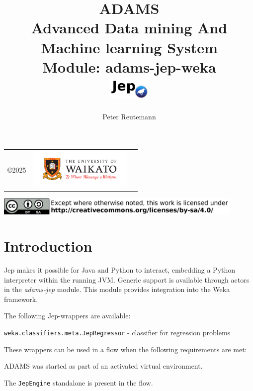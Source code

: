 \documentclass[a4paper]{book}
\title{
  \textbf{ADAMS} \\
  {\Large \textbf{A}dvanced \textbf{D}ata mining \textbf{A}nd \textbf{M}achine
  learning \textbf{S}ystem} \\
  {\Large Module: adams-jep-weka} \\
  \vspace{1cm}
  \includegraphics[width=2cm]{images/jep-weka-module.png} \\
}
\author{
  Peter Reutemann
}
\begin{document}
\begin{titlepage}
\maketitle

\thispagestyle{empty}
\center
\begin{table}[b]
	\begin{tabular}{c l l}
		\parbox[c][2cm]{2cm}{\copyright 2025} &
		\parbox[c][2cm]{5cm}{\includegraphics[width=5cm]{images/coat_of_arms.pdf}} \\
	\end{tabular}
	\includegraphics[width=12cm]{images/cc.png} \\
\end{table}

\end{titlepage}

\tableofcontents


\chapter{Introduction}
Jep\cite{jep} makes it possible for Java and Python to interact, embedding a Python
interpreter within the running JVM. Generic support is available through actors
in the \textit{adams-jep} module. This module provides integration into the Weka
framework.

\noindent The following Jep-wrappers are available:
\begin{tight_itemize}
    \item \texttt{weka.classifiers.meta.JepRegressor} - classifier for regression problems
\end{tight_itemize}

\noindent These wrappers can be used in a flow when the following requirements are met:
\begin{tight_itemize}
    \item ADAMS was started as part of an activated virtual environment.
    \item The \texttt{JepEngine} standalone is present in the flow.
\end{tight_itemize}



\end{document}
